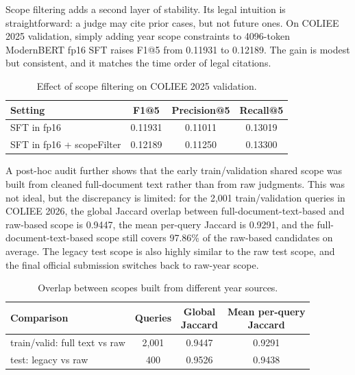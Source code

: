 Scope filtering adds a second layer of stability. Its legal intuition is straightforward: a judge may cite prior cases, but not future ones. On COLIEE 2025 validation, simply adding year scope constraints to 4096-token ModernBERT fp16 SFT raises F1@5 from 0.11931 to 0.12189. The gain is modest but consistent, and it matches the time order of legal citations.

\begin{table}[t]
  \centering
  \small
  \begin{tabular}{lccc}
    \toprule
    Setting & F1@5 & Precision@5 & Recall@5 \\
    \midrule
    SFT in fp16 & 0.11931 & 0.11011 & 0.13019 \\
    SFT in fp16 + scopeFilter & 0.12189 & 0.11250 & 0.13300 \\
    \bottomrule
  \end{tabular}
  \caption{Effect of scope filtering on COLIEE 2025 validation.}
  \label{tab:scopefilter-effect}
\end{table}

A post-hoc audit further shows that the early train/validation shared scope was built from cleaned full-document text rather than from raw judgments. This was not ideal, but the discrepancy is limited: for the 2,001 train/validation queries in COLIEE 2026, the global Jaccard overlap between full-document-text-based and raw-based scope is 0.9447, the mean per-query Jaccard is 0.9291, and the full-document-text-based scope still covers 97.86\% of the raw-based candidates on average. The legacy test scope is also highly similar to the raw test scope, and the final official submission switches back to raw-year scope.

\begin{table}[t]
  \centering
  \scriptsize
  \begin{tabular}{@{}p{}ccc@{}}
    \toprule
    Comparison & Queries & \shortstack{Global\\Jaccard} & \shortstack{Mean per-query\\Jaccard} \\
    \midrule
    train/valid: full text vs raw & 2,001 & 0.9447 & 0.9291 \\
    test: legacy vs raw & 400 & 0.9526 & 0.9438 \\
    \bottomrule
  \end{tabular}
  \caption{Overlap between scopes built from different year sources.}
  \label{tab:scope-overlap}
\end{table}

